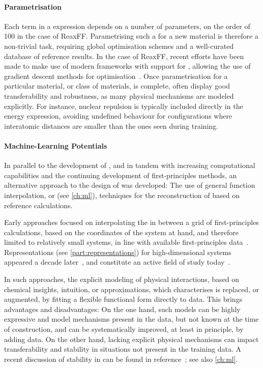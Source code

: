 \paragraph{Parametrisation} Each term in a \ff expression depends on a number of parameters, on the order of \num{100} in the case of ReaxFF. Parametrising such a \ff for a new material is therefore a non-trivial task, requiring global optimisation schemes and a well-curated database of reference results.
In the case of ReaxFF, recent efforts have been made to make use of modern \ml frameworks with support for \ad, allowing the use of gradient descent methods for optimisation~\cite{dycg2021p,krma2022p}. 
Once parametrisation for a particular material, or class of materials, is complete, \ffs often display good transferability and robustness, as many physical mechanisms are modeled explicitly. For instance, nuclear repulsion is typically included directly in the energy expression, avoiding undefined behaviour for configurations where interatomic distances are smaller than the ones seen during training.

\paragraph{Machine-Learning Potentials} In parallel to the development of \ffs, and in tandem with increasing computational capabilities and the continuing development of first-principles methods, an alternative approach to the design of \ffs was developed: The use of general function interpolation, or  (see \cref{ch:ml}), techniques for the reconstruction of \pes based on reference calculations.

Early  approaches focused on interpolating the \pes in between a grid of first-principles calculations, based on the coordinates of the system at hand, and therefore limited to relatively small systems, in line with available first-principles data~\cite{bbh1986q,dnu1991q,hhlr1992q,hhr1999q}.
Representations (see \cref{part:representations}) for high-dimensional systems appeared a decade later~\cite{lhsr2006q,bp2007q,bpkc2010q}, and constitute an active field of study today~\cite{ukkm2020q,uctm2021q,pt2021q}.

In such approaches, the explicit modeling of physical interactions, based on chemical insights, intuition, or approximations, which characterises \ffs is replaced, or augmented, by fitting a flexible functional form directly to data. This brings advantages and disadvantages: On the one hand, such models can be highly expressive and model mechanisms present in the data, but not known at the time of \mlp construction, and can be systematically improved, at least in principle, by adding data. On the other hand, lacking explicit physical mechanisms can impact transferability and stability in situations not present in the training data. A recent discussion of stability in \md can be found in reference~\cite{fwgj2022a}; see also \cref{ch:ml}.


